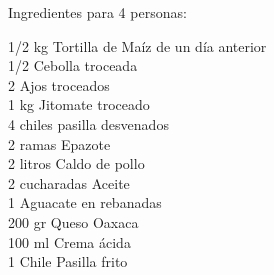 Ingredientes para 4 personas: 

\begin{center}
1/2 kg Tortilla de Maíz de un día anterior \\
1/2 Cebolla troceada\\
2 Ajos troceados\\
1 kg Jitomate troceado\\
4 chiles pasilla desvenados\\
2 ramas Epazote \\
2 litros Caldo de pollo\\
2 cucharadas Aceite\\
1 Aguacate en rebanadas\\
200 gr Queso Oaxaca\\
100 ml Crema ácida\\
1 Chile Pasilla frito\\  
\end{center}
